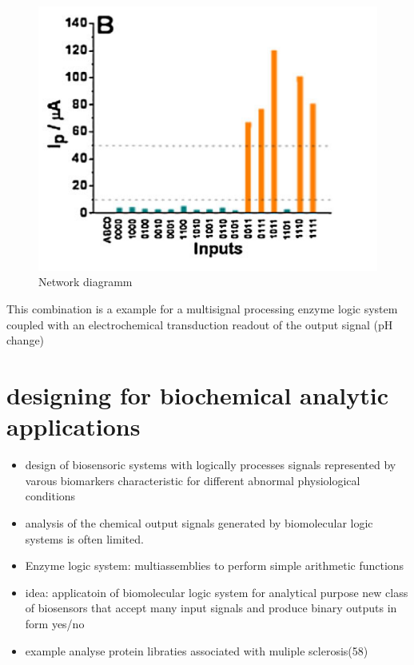 \documentclass[runningheads]{llncs}
\begin{document}
	\begin{figure} \centering \includegraphics[scale= 0.2]{ph.png} \caption{Network diagramm} \label{img:ph} \end{figure}
This combination is a example for a multisignal processing enzyme logic system coupled with an electrochemical transduction readout of the output signal (pH change)
\section{designing for biochemical analytic applications}
	\begin{itemize}
		\item design of biosensoric systems with logically processes signals represented by varous biomarkers characteristic for different abnormal physiological conditions
		\item analysis of the chemical output signals generated by biomolecular logic systems is often limited.
		\item Enzyme logic system: multiassemblies to perform simple arithmetic functions
		\item idea: applicatoin of biomolecular logic system for analytical purpose new class of biosensors that accept many input signals and produce binary outputs in form yes/no 
		\item example analyse protein libraties associated with muliple sclerosis(58)
	\end{itemize}
\end{document}
